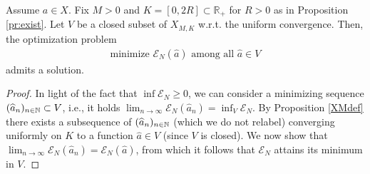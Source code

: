 \begin{proposition}\label{ENmin}
Assume $a \in X$. Fix $M > 0$ and $K=[0,2R] \subset  \mathbb R_+$ for $R>0$ as in Proposition \ref{pr:exist}. Let $V$ be a closed subset of $X_{M,K}$ w.r.t. the uniform convergence. Then, the optimization problem
\begin{align*}
	\mbox{minimize } \mathcal E_N(\widehat a) \mbox{ among all } \widehat a \in V
\end{align*}
admits a solution.
\end{proposition}
\begin{proof}
In light of the fact that $\inf \mathcal E_N \geq 0$, we can consider a minimizing sequence $(\widehat a_n)_{n \in \mathbb{N}} \subset V$, i.e., it holds $\lim_{n \rightarrow \infty} \mathcal E_N(\widehat a_n) = \inf_{V} \mathcal E_N$. By Proposition \ref{XMdef} there exists a subsequence of $(\widehat a_n)_{n \in \mathbb{N}}$ (which we do not relabel) converging uniformly on $K$ to a function $\widehat a \in V$ (since $V$ is closed). We now show that $\lim_{n \rightarrow \infty} \mathcal E_N(\widehat a_n) = \mathcal  E_N(\widehat a)$, from which it follows  that $\mathcal  E_N$ attains its minimum in $V$. 


\end{proof}
